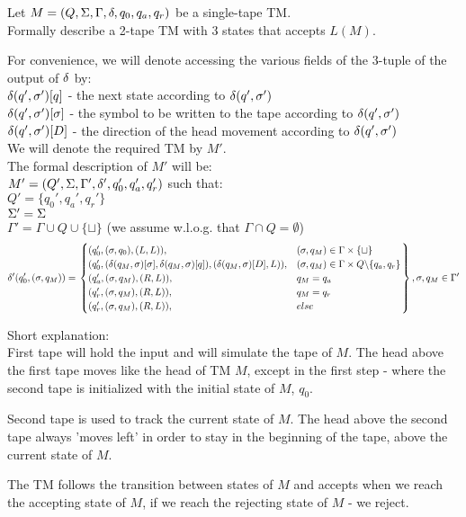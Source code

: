 Let $M = (Q, \Sigma, \Gamma, \delta, q_0, q_a, q_r)$ be a single-tape TM. \\
Formally describe a 2-tape TM with 3 states that accepts $L(M)$.

For convenience, we will denote accessing the various fields of the 3-tuple
of the output of $\delta$ by: \\
$\delta(q', \sigma')[q]$ - the next state according to $\delta(q', \sigma')$ \\
$\delta(q', \sigma')[\sigma]$ - the symbol to be written to the tape according to $\delta(q', \sigma')$ \\
$\delta(q', \sigma')[D]$ - the direction of the head movement according to $\delta(q', \sigma')$ \\

We will denote the required TM by $M'$. \\
The formal description of $M'$ will be: \\
$ M' = (Q', \Sigma, \Gamma', \delta', q_0', q_a', q_r') $ such that: \\
$ Q'      = \{q_0', q_a', q_r'\} $ \\
$ \Sigma'    = \Sigma $ \\
$ \Gamma' = \Gamma \cup Q \cup \{\sqcup\} $ (we assume w.l.o.g. that $\Gamma \cap Q = \emptyset$) \\
\[
    \delta'(q_0', (\sigma, q_M)) = \left.
    \begin{cases}
        (q_0', (\sigma, q_0), (L, L)) ,                                            & (\sigma, q_M) \in \Gamma \times \{\sqcup\}                \\
        (q_0', (\delta(q_M, \sigma)[\sigma], \delta(q_M, \sigma)[q]), (\delta(q_M, \sigma)[D], L)) , & (\sigma, q_M) \in \Gamma \times Q \backslash \{q_a, q_r\} \\
        (q_a', (\sigma, q_M), (R, L)),                                             & q_M = q_a                                              \\
        (q_r', (\sigma, q_M), (R, L)),                                             & q_M = q_r                                              \\
        (q_r', (\sigma, q_M), (R, L)),                                             & else                                                   \\
    \end{cases}
    \right\} , \sigma, q_M \in \Gamma' \\
\]

Short explanation: \\
First tape will hold the input and will simulate the tape of $M$.
The head above the first tape moves like the head of TM $M$,
except in the first step - where the second tape is initialized with
the initial state of $M$, $q_0$.

Second tape is used to track the current state of $M$.
The head above the second tape always 'moves left' in order to
stay in the beginning of the tape, above the current state of $M$.

The TM follows the transition between states of $M$ and accepts
when we reach the accepting state of $M$, if we reach the rejecting state of $M$ - we reject.